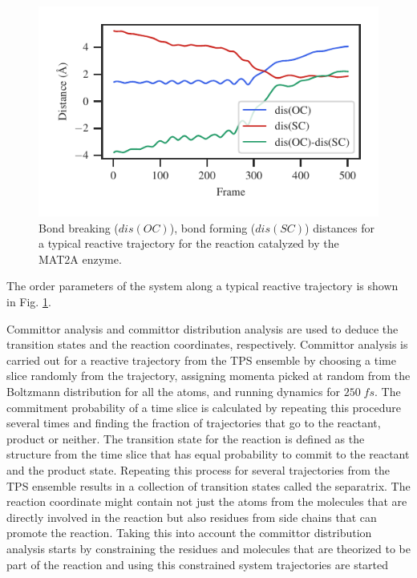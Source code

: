 \documentclass[journal=jpcbfk,manuscript=article,layout=traditional]{achemso}
\begin{document}
\begin{figure}
\includegraphics[scale=1.0]{figures/mat2a-diff167.pdf}
\caption{Bond breaking ($dis(OC)$), bond forming ($dis(SC)$) distances for a typical 
reactive trajectory for the reaction catalyzed by the MAT2A enzyme.}
\label{fig:mat2a-reactive-traj}
\end{figure}
The order parameters of the system along a typical reactive trajectory is 
shown in Fig. \ref{fig:mat2a-reactive-traj}.

Committor analysis and committor distribution analysis are used to deduce 
the transition states and the reaction coordinates, respectively. 
Committor analysis is carried out for a reactive trajectory 
from the TPS ensemble by choosing a time slice randomly from the trajectory, assigning
momenta picked at random from the Boltzmann distribution for all the atoms, and running 
dynamics for $250\;fs$. The commitment probability of a time slice is calculated by 
repeating this procedure several times and finding the fraction of trajectories that go 
to the reactant, product or neither. The transition state for the reaction is defined as 
the structure from the time slice that has equal probability to commit to the reactant 
and the product state. Repeating this process for several trajectories from the TPS
ensemble results in a collection of transition states called the separatrix. 
The reaction coordinate might contain not just the atoms from the molecules that 
are directly involved in the reaction but also residues from side chains that can 
promote the reaction. Taking this into account the committor distribution analysis
starts by constraining the residues and molecules that are theorized to be part of the 
reaction and using this constrained system trajectories are started   
\end{document}
